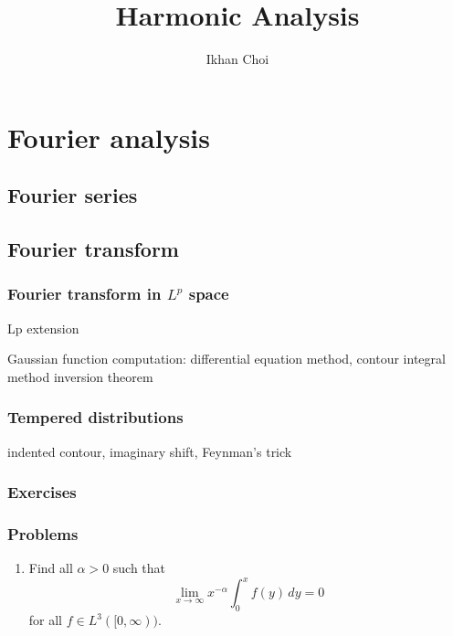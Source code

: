 \documentclass{../note}
\begin{document}
\title{Harmonic Analysis}
\author{Ikhan Choi}
\maketitle
\tableofcontents

\part{Fourier analysis}

\chapter{Fourier series}

\chapter{Fourier transform}
\section{Fourier transform in $L^p$ space}
\begin{prb}
\end{prb}
Lp extension

Gaussian function computation: differential equation method, contour integral method
inversion theorem
\begin{prb}
\end{prb}

\section{Tempered distributions}
\begin{prb}
indented contour, imaginary shift, Feynman's trick
\end{prb}

\section*{Exercises}
\section*{Problems}
\begin{enumerate}
\item Find all $\alpha>0$ such that
\[\lim_{x\to\infty}x^{-\alpha}\int_0^xf(y)\,dy=0\]
for all $f\in L^3([0,\infty))$.
\end{enumerate}
\end{document}
